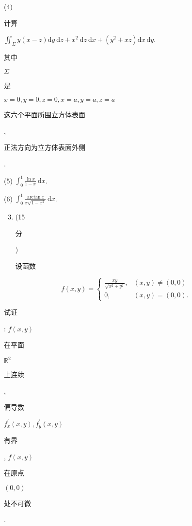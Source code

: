 \documentclass[10pt]{article}
\begin{document}
(4) \begin{CJK}{UTF8}{mj}计算\end{CJK} $\iint_{\Sigma} y(x-z) \mathrm{d} y \mathrm{~d} z+x^{2} \mathrm{~d} z \mathrm{~d} x+\left(y^{2}+x z\right) \mathrm{d} x \mathrm{~d} y$. \begin{CJK}{UTF8}{mj}其中\end{CJK} $\Sigma$ \begin{CJK}{UTF8}{mj}是\end{CJK} $x=0, y=0, z=0, x=a, y=a, z=a$ \begin{CJK}{UTF8}{mj}这六个平面所围立方体表面\end{CJK}, \begin{CJK}{UTF8}{mj}正法方向为立方体表面外侧\end{CJK}.

(5) $\int_{0}^{1} \frac{\ln x}{1-x} \mathrm{~d} x$.

(6) $\int_{0}^{1} \frac{\arctan x}{x \sqrt{1-x^{2}}} \mathrm{~d} x$.

\begin{enumerate}
  \setcounter{enumi}{2}
  \item (15 \begin{CJK}{UTF8}{mj}分\end{CJK}) \begin{CJK}{UTF8}{mj}设函数\end{CJK}
\end{enumerate}
$$
f(x, y)= \begin{cases}\frac{x y}{\sqrt{x^{2}+y^{2}}}, & (x, y) \neq(0,0) \\ 0, & (x, y)=(0,0) .\end{cases}
$$
\begin{CJK}{UTF8}{mj}试证\end{CJK}: $f(x, y)$ \begin{CJK}{UTF8}{mj}在平面\end{CJK} $\mathbb{R}^{2}$ \begin{CJK}{UTF8}{mj}上连续\end{CJK}, \begin{CJK}{UTF8}{mj}偏导数\end{CJK} $f_{x}^{\prime}(x, y), f_{y}^{\prime}(x, y)$ \begin{CJK}{UTF8}{mj}有界\end{CJK}, $f(x, y)$ \begin{CJK}{UTF8}{mj}在原点\end{CJK} $(0,0)$ \begin{CJK}{UTF8}{mj}处不可微\end{CJK}.
\end{document}
